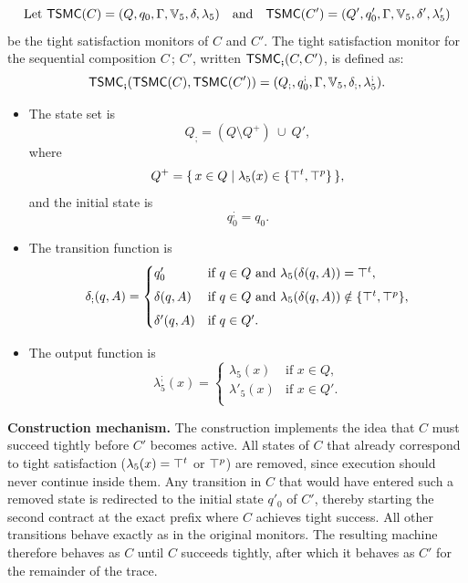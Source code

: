 \begin{definition}
\label{def:moore-seq}
\[\text{Let }
\mathsf{TSMC}(C)  = (Q, q_0, \Gamma, \mathbb{V}_5 , \delta, \lambda_5)
\quad\text{and}\quad
\mathsf{TSMC}(C') = (Q', q'_0, \Gamma, \mathbb{V}_5 , \delta', \lambda'_5)
\]
be the tight satisfaction monitors of $C$ and $C'$.  
The tight satisfaction monitor for the sequential composition
$C\,;\,C'$, written $\mathsf{TSMC}_{\bm{;}}(C,C')$, is defined as:
\[
\mathsf{TSMC}_{\bm{;}}(\mathsf{TSMC}(C),\mathsf{TSMC}(C'))
  = (Q_{;}, q_0^{;}, \Gamma, \mathbb{V}_5 , \delta_{;}, \lambda_5^{;}).
\]

\begin{itemize}
  \item The state set is
  \[
    Q_{;} = (Q \setminus Q^{+})\ \cup\ Q',
  \]
  where
  \[
    Q^{+} = \{\,x \in Q \mid \lambda_5(x) \in \{\top^t,\top^p\}\,\},
  \]
  and the initial state is
  \[
    q_0^{;} = q_0.
  \]

  \item The transition function is
  \[
  \delta_{;}(q,A) =
  \begin{cases}
    q'_0 
      & \text{if } q\in Q \text{ and } \lambda_5(\delta(q,A)) = \top^t, \\[4pt]
    \delta(q,A)
      & \text{if } q\in Q \text{ and } \lambda_5(\delta(q,A)) \notin \{\top^t,\top^p\}, \\[4pt]
    \delta'(q,A)
      & \text{if } q\in Q'. \\
  \end{cases}
  \]

  \item The output function is
  \[
  \lambda_5^{;}(x) =
  \begin{cases}
    \lambda_5(x)  & \text{if } x\in Q,\\
    \lambda'_5(x) & \text{if } x\in Q'. \\
  \end{cases}
  \]
\end{itemize}
\end{definition}

\noindent
\textbf{Construction mechanism.}
The construction implements the idea that $C$ must succeed tightly before
$C'$ becomes active. All states of $C$ that already correspond to tight
satisfaction ($\lambda_5(x)=\top^t$ or $\top^p$) are removed, since execution
should never continue inside them. Any transition in $C$ that would have
entered such a removed state is redirected to the initial state $q'_0$ of
$C'$, thereby starting the second contract at the exact prefix where $C$
achieves tight success. All other transitions behave exactly as in the
original monitors. The resulting machine therefore behaves as $C$ until $C$
succeeds tightly, after which it behaves as $C'$ for the remainder of the
trace.

